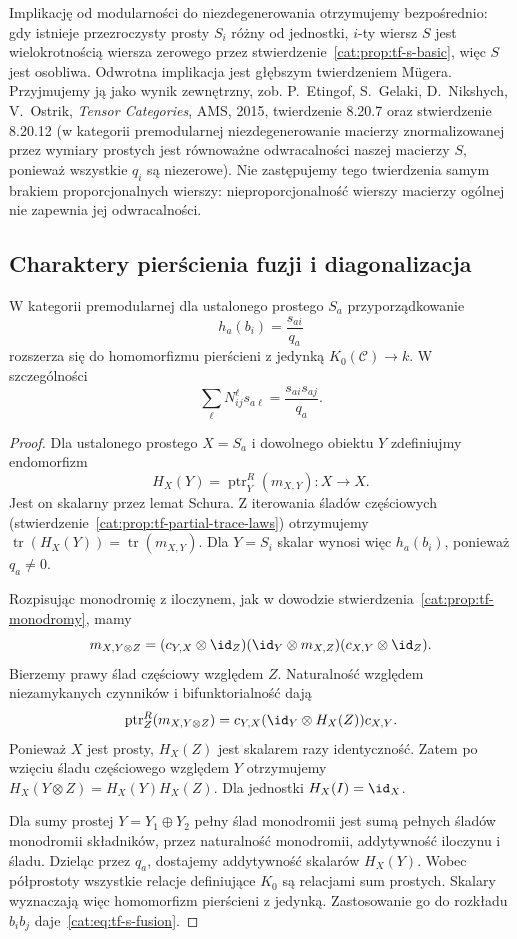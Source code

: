 Implikację od modularności do niezdegenerowania otrzymujemy bezpośrednio: gdy istnieje przezroczysty prosty $S_i$ różny od jednostki, $i$-ty wiersz $S$ jest wielokrotnością wiersza zerowego przez stwierdzenie~\ref{cat:prop:tf-s-basic}, więc $S$ jest osobliwa. Odwrotna implikacja jest głębszym twierdzeniem Mügera. Przyjmujemy ją jako wynik zewnętrzny, zob. P.~Etingof, S.~Gelaki, D.~Nikshych, V.~Ostrik, \emph{Tensor Categories}, AMS, 2015, twierdzenie 8.20.7 oraz stwierdzenie 8.20.12 (w kategorii premodularnej niezdegenerowanie macierzy znormalizowanej przez wymiary prostych jest równoważne odwracalności naszej macierzy $S$, ponieważ wszystkie $q_i$ są niezerowe). Nie zastępujemy tego twierdzenia samym brakiem proporcjonalnych wierszy: nieproporcjonalność wierszy macierzy ogólnej nie zapewnia jej odwracalności.

\subsection{Charaktery pierścienia fuzji i diagonalizacja}

\begin{twierdzenie}\label{cat:thm:tf-s-characters}
W kategorii premodularnej dla ustalonego prostego $S_a$ przyporządkowanie
\[
 h_a(b_i)=\frac{s_{ai}}{q_a}
\]
rozszerza się do homomorfizmu pierścieni z jedynką $K_0(\mathcal C)\to k$. W szczególności
\begin{equation}\label{cat:eq:tf-s-fusion}
 \sum_\ell N_{ij}^{\ell}s_{a\ell}
 =\frac{s_{ai}s_{aj}}{q_a}.
\end{equation}
\end{twierdzenie}
\begin{proof}
Dla ustalonego prostego $X=S_a$ i dowolnego obiektu $Y$ zdefiniujmy endomorfizm
\[
 H_X(Y)=\operatorname{ptr}^{R}_{Y}(m_{X,Y}):X\to X.
\]
Jest on skalarny przez lemat Schura. Z iterowania śladów częściowych (stwierdzenie~\ref{cat:prop:tf-partial-trace-laws}) otrzymujemy
$\operatorname{tr}(H_X(Y))=\operatorname{tr}(m_{X,Y})$.
Dla $Y=S_i$ skalar wynosi więc $h_a(b_i)$, ponieważ $q_a\neq0$.

Rozpisując monodromię z iloczynem, jak w dowodzie stwierdzenia~\ref{cat:prop:tf-monodromy}, mamy
\[
 m_{X,Y\otimes Z}
 =(c_{Y,X}\otimes\id_Z)(\id_Y\otimes m_{X,Z})
 (c_{X,Y}\otimes\id_Z).
\]
Bierzemy prawy ślad częściowy względem $Z$. Naturalność względem niezamykanych czynników i bifunktorialność dają
\[
 \operatorname{ptr}^{R}_{Z}(m_{X,Y\otimes Z})
 =c_{Y,X}(\id_Y\otimes H_X(Z))c_{X,Y}.
\]
Ponieważ $X$ jest prosty, $H_X(Z)$ jest skalarem razy identyczność. Zatem po wzięciu śladu częściowego względem $Y$ otrzymujemy
$H_X(Y\otimes Z)=H_X(Y)H_X(Z)$.
Dla jednostki $H_X(I)=\id_X$.

Dla sumy prostej $Y=Y_1\oplus Y_2$ pełny ślad monodromii jest sumą pełnych śladów monodromii składników, przez naturalność monodromii, addytywność iloczynu i śladu. Dzieląc przez $q_a$, dostajemy addytywność skalarów $H_X(Y)$. Wobec półprostoty wszystkie relacje definiujące $K_0$ są relacjami sum prostych. Skalary wyznaczają więc homomorfizm pierścieni z jedynką. Zastosowanie go do rozkładu $b_ib_j$ daje~\eqref{cat:eq:tf-s-fusion}.
\end{proof}

